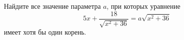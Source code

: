 \begin{ex}
	\begin{condition}
		Найдите все значение параметра \( a \), при которых уравнение
		\[ 5x+\dfrac{18}{\sqrt{x^2+36}}=a\sqrt{x^2+36} \]
		имеет хотя бы один корень.
	\end{condition}
\end{ex}